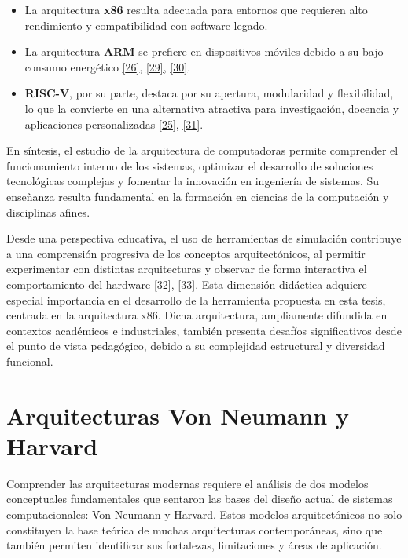 \documentclass[12pt,oneside]{templates/unerthesis}
\providecommand{\tightlist}{%
  \setlength{\itemsep}{0pt}\setlength{\parskip}{0pt}}
\begin{document}
\begin{itemize}
\tightlist
\item
  La arquitectura \textbf{x86} resulta adecuada para entornos que requieren alto rendimiento y compatibilidad con software legado.
\item
  La arquitectura \textbf{ARM} se prefiere en dispositivos móviles debido a su bajo consumo energético \protect\hyperlink{ref-harris2015digital}{{[}26{]}}, \protect\hyperlink{ref-patterson_computer_2016}{{[}29{]}}, \protect\hyperlink{ref-belli2020iot}{{[}30{]}}.
\item
  \textbf{RISC-V}, por su parte, destaca por su apertura, modularidad y flexibilidad, lo que la convierte en una alternativa atractiva para investigación, docencia y aplicaciones personalizadas \protect\hyperlink{ref-waterman_risc-v_2014}{{[}25{]}}, \protect\hyperlink{ref-patterson_computer_2017}{{[}31{]}}.
\end{itemize}

En síntesis, el estudio de la arquitectura de computadoras permite comprender el funcionamiento interno de los sistemas, optimizar el desarrollo de soluciones tecnológicas complejas y fomentar la innovación en ingeniería de sistemas. Su enseñanza resulta fundamental en la formación en ciencias de la computación y disciplinas afines.

Desde una perspectiva educativa, el uso de herramientas de simulación contribuye a una comprensión progresiva de los conceptos arquitectónicos, al permitir experimentar con distintas arquitecturas y observar de forma interactiva el comportamiento del hardware \protect\hyperlink{ref-akram2019survey}{{[}32{]}}, \protect\hyperlink{ref-menchonherramientas}{{[}33{]}}. Esta dimensión didáctica adquiere especial importancia en el desarrollo de la herramienta propuesta en esta tesis, centrada en la arquitectura x86. Dicha arquitectura, ampliamente difundida en contextos académicos e industriales, también presenta desafíos significativos desde el punto de vista pedagógico, debido a su complejidad estructural y diversidad funcional.

\hypertarget{arquitecturas-von-neumann-y-harvard}{%
\section{Arquitecturas Von Neumann y Harvard}\label{arquitecturas-von-neumann-y-harvard}}

Comprender las arquitecturas modernas requiere el análisis de dos modelos conceptuales fundamentales que sentaron las bases del diseño actual de sistemas computacionales: Von Neumann y Harvard. Estos modelos arquitectónicos no solo constituyen la base teórica de muchas arquitecturas contemporáneas, sino que también permiten identificar sus fortalezas, limitaciones y áreas de aplicación.
\end{document}
